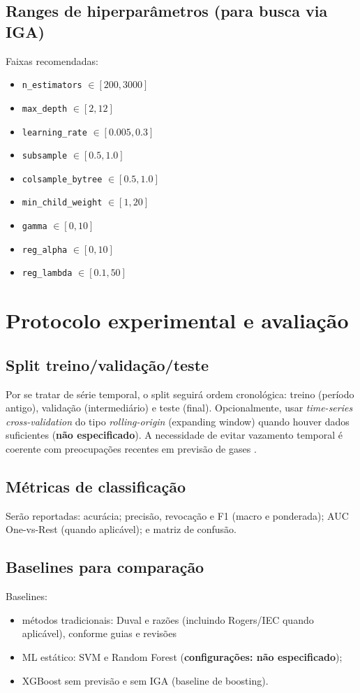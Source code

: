 \subsection{Ranges de hiperparâmetros (para busca via IGA)}
Faixas recomendadas:
\begin{itemize}
\item \texttt{n\_estimators} $\in[200,3000]$
\item \texttt{max\_depth} $\in[2,12]$
\item \texttt{learning\_rate} $\in[0.005,0.3]$
\item \texttt{subsample} $\in[0.5,1.0]$
\item \texttt{colsample\_bytree} $\in[0.5,1.0]$
\item \texttt{min\_child\_weight} $\in[1,20]$
\item \texttt{gamma} $\in[0,10]$
\item \texttt{reg\_alpha} $\in[0,10]$
\item \texttt{reg\_lambda} $\in[0.1,50]$
\end{itemize}

\section{Protocolo experimental e avaliação}\label{sec:protocolo}
\subsection{Split treino/validação/teste}
Por se tratar de série temporal, o split seguirá ordem cronológica:
treino (período antigo), validação (intermediário) e teste (final).
Opcionalmente, usar \textit{time-series cross-validation} do tipo
\textit{rolling-origin} (expanding window) quando houver dados suficientes
(\textbf{não especificado}).
A necessidade de evitar vazamento temporal é coerente com preocupações recentes em previsão de gases \cite{chen2024_sds_vmd_lstm_dga}.

\subsection{Métricas de classificação}
Serão reportadas:
acurácia; precisão, revocação e F1 (macro e ponderada);
AUC One-vs-Rest (quando aplicável);
e matriz de confusão.

\subsection{Baselines para comparação}
Baselines:
\begin{itemize}
\item métodos tradicionais: Duval e razões (incluindo Rogers/IEC
quando aplicável), conforme guias e revisões
\cite{iec60599_2022,ieee_c57_104_2019,cigre_tb771_2019,nanfak2024_traditional_dga_review,duval2002_review}
\item ML estático: SVM e Random Forest (\textbf{configurações:
não especificado});
\item XGBoost sem previsão e sem IGA (baseline de boosting).
\end{itemize}

